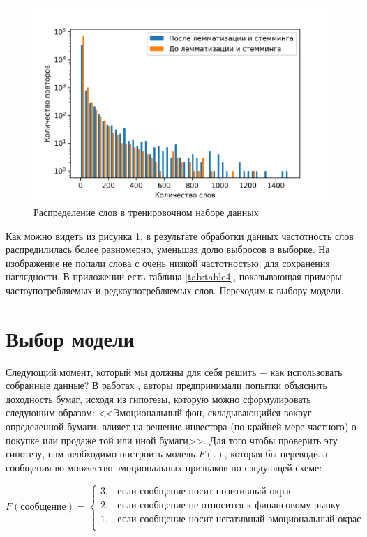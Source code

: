 \documentclass{article}
\begin{document}
\begin{figure}[h]
	\centering
	\includegraphics[scale=0.65]{before_after.png}
	\caption{Распределение слов в тренировочном наборе данных}
	\label{pic:dist}
\end{figure}

Как можно видеть из рисунка \ref{pic:dist}, в результате обработки данных частотность слов распредилилась более равномерно, уменьшая долю выбросов в выборке. На изображение не попали слова с очень низкой частотностью, для сохранения наглядности. В приложении есть таблица \ref{tab:table4}, показывающая примеры частоупотребляемых и редкоупотребляемых слов. Переходим к выбору модели.

\section{Выбор модели}
Следующий момент, который мы должны для себя решить $-$ как использовать собранные данные? В работах \cite{2014oli}, \cite{2017ren} авторы предпринимали попытки объяснить доходность бумаг, исходя из гипотезы, которую можно сформулировать следующим образом: <<Эмоциональный фон, складывающийся вокруг определенной бумаги, влияет на решение инвестора (по крайней мере частного) о покупке или продаже той или иной бумаги>>. Для того чтобы проверить эту гипотезу, нам необходимо построить модель $F(.)$, которая бы переводила сообщения во множество эмоциональных признаков по следующей схеме:

\begin{equation}
\label{eq:F}
F(\text{сообщение}) = 
\begin{cases}
3, &\text{если сообщение носит позитивный окрас}\\
2, &\text{если сообщение не относится к финансовому рынку} \\
1, &\text{если сообщение носит негативный эмоциональный окрас} \\
\end{cases}
\end{equation}
\end{document}
